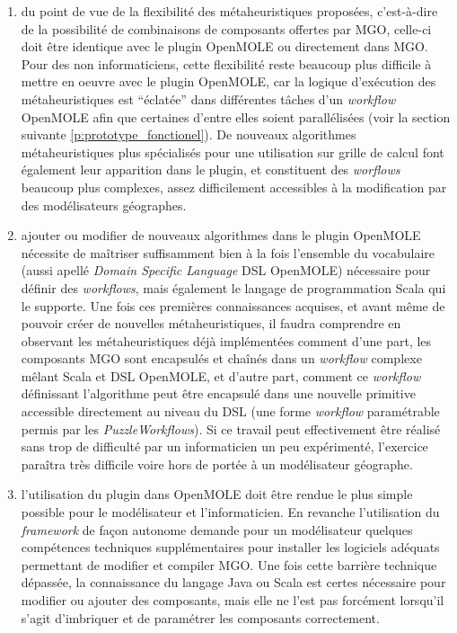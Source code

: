 \begin{enumerate}[label=(\arabic*)]
\item du point de vue de la flexibilité des métaheuristiques proposées, c'est-à-dire de la possibilité de combinaisons de composants offertes par MGO, celle-ci  doit être identique avec le plugin OpenMOLE ou directement dans MGO. Pour des non informaticiens, cette flexibilité reste beaucoup plus difficile à mettre en oeuvre avec le plugin OpenMOLE, car la logique d'exécution des métaheuristiques est \enquote{éclatée} dans différentes tâches d'un \textit{workflow} OpenMOLE afin que certaines d'entre elles soient parallélisées (voir la section suivante \ref{p:prototype_fonctionel}). De nouveaux algorithmes métaheuristiques plus spécialisés pour une utilisation sur grille de calcul font également leur apparition dans le plugin, et constituent des \textit{worflows} beaucoup plus complexes, assez difficilement accessibles à la modification par des modélisateurs géographes.

\item ajouter ou modifier de nouveaux algorithmes dans le plugin OpenMOLE nécessite de maîtriser suffisamment bien à la fois l'ensemble du vocabulaire (aussi apellé \textit{Domain Specific Language} DSL OpenMOLE) nécessaire pour définir des \textit{workflows}, mais également le langage de programmation Scala qui le supporte. Une fois ces premières connaissances acquises, et avant même de pouvoir créer de nouvelles métaheuristiques, il faudra comprendre en observant les métaheuristiques déjà implémentées comment d'une part, les composants MGO sont encapsulés et chaînés dans un \textit{workflow} complexe mêlant Scala et DSL OpenMOLE, et d'autre part, comment ce \textit{workflow} définissant l'algorithme peut être encapsulé dans une nouvelle primitive accessible directement au niveau du DSL (une forme \textit{workflow} paramétrable permis par les \textit{PuzzleWorkflows}). Si ce travail peut effectivement être réalisé sans trop de difficulté par un informaticien un peu expérimenté, l'exercice paraîtra très difficile voire hors de portée à un modélisateur géographe.

\item l'utilisation du plugin dans OpenMOLE doit être rendue le plus simple possible pour le modélisateur et l'informaticien. En revanche l'utilisation du \textit{framework} de façon autonome demande pour un modélisateur quelques compétences techniques supplémentaires pour installer les logiciels adéquats permettant de modifier et compiler MGO. Une fois cette barrière technique dépassée, la connaissance du langage Java ou Scala est certes nécessaire pour modifier ou ajouter des composants, mais elle ne l'est pas forcément lorsqu'il s'agit d'imbriquer et de paramétrer les composants correctement.

\end{enumerate}

